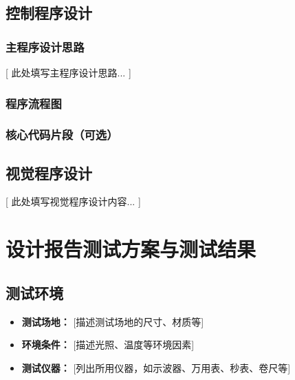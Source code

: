 \documentclass[UTF-8,zihao=-4]{ctexart}
\begin{document}
\subsection{控制程序设计}

\subsubsection{主程序设计思路}
    [ 此处填写主程序设计思路... ]

\subsubsection{程序流程图}

\subsubsection{核心代码片段（可选）}

\subsection{视觉程序设计}
    [ 此处填写视觉程序设计内容... ]

\section{设计报告测试方案与测试结果}

\subsection{测试环境}
    \begin{itemize}
        \item \textbf{测试场地：} [描述测试场地的尺寸、材质等]
        \item \textbf{环境条件：} [描述光照、温度等环境因素]
        \item \textbf{测试仪器：} [列出所用仪器，如示波器、万用表、秒表、卷尺等]
    \end{itemize}
\end{document}

